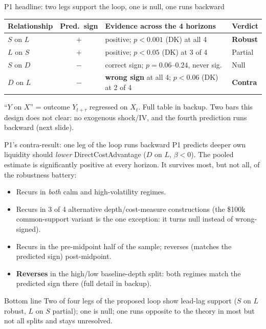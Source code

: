 \documentclass[aspectratio=169]{beamer}
\begin{document}
\begin{frame}{P1 headline: two legs support the loop, one is null, one runs backward}
  \small
  \begin{center}
  \begin{tabular}{@{}p{3.6cm}c p{5.1cm} l@{}}
    \toprule
    Relationship & Pred.\ sign & Evidence across the 4 horizons & Verdict \\
    \midrule
    $S$ on $L$ & $+$ & positive; $p<0.001$ (DK) at all 4 & \textbf{Robust} \\
    $L$ on $S$ & $+$ & positive; $p<0.05$ (DK) at 3 of 4 & Partial \\
    $S$ on $D$ & $-$ & correct sign; $p=0.06$--$0.24$, never sig. & Null \\
    $D$ on $L$ & $-$ & \textbf{wrong sign} at all 4; $p<0.06$ (DK) at 2 of 4 & \textbf{Contra} \\
    \bottomrule
  \end{tabular}
  \end{center}
  \vspace{0.6em}
  {\footnotesize ``$Y$ on $X$'' = outcome $Y_{t+\tau}$ regressed on $X_t$. Full table in backup. Two bars this design does not clear: no exogenous shock/IV, and the fourth prediction runs backward (next slide).}
\end{frame}

\begin{frame}{P1's contra-result: one leg of the loop runs backward}
  \small
  P1 predicts deeper own liquidity should \emph{lower} DirectCostAdvantage ($D$ on $L$, $\beta<0$). The pooled estimate is significantly positive at every horizon. It survives most, but not all, of the robustness battery:
  \begin{itemize}
    \item Recurs in \emph{both} calm and high-volatility regimes.
    \item Recurs in 3 of 4 alternative depth/cost-measure constructions (the \$100k common-support variant is the one exception: it turns null instead of wrong-signed).
    \item Recurs in the pre-midpoint half of the sample; reverses (matches the predicted sign) post-midpoint.
    \item \textbf{Reverses} in the high/low baseline-depth split: both regimes match the predicted sign there (full detail in backup).
  \end{itemize}
  \vspace{0.4em}
  \begin{alertblock}{Bottom line}
    Two of four legs of the proposed loop show lead-lag support ($S$ on $L$ robust, $L$ on $S$ partial); one is null; one runs opposite to the theory in most but not all splits and stays unresolved.
  \end{alertblock}
\end{frame}
\end{document}
